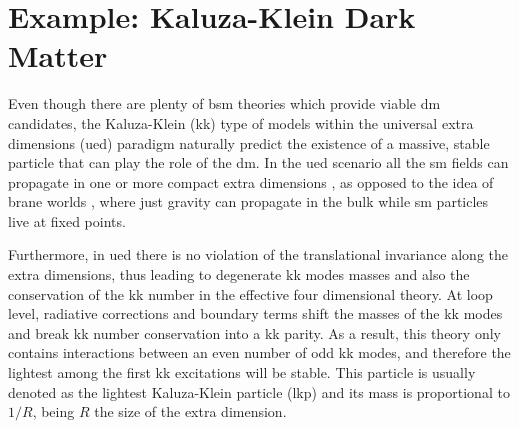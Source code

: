 \section{Example: Kaluza-Klein Dark Matter}
\label{sec:dm_analysis_kk_dm}

Even though there are plenty of \gls{bsm} theories which provide viable \gls{dm} candidates, the Kaluza-Klein (\gls{kk}) type of models \cite{Kaluza1921, Klein1926} within the universal extra dimensions (\gls{ued}) paradigm naturally predict the existence of a massive, stable particle that can play the role of the \gls{dm}. In the \gls{ued} scenario all the \gls{sm} fields can propagate in one or more compact extra dimensions \cite{Appelquist2000}, as opposed to the idea of brane worlds \cite{Arkani-Hamed1998, Randall1999}, where just gravity can propagate in the bulk while \gls{sm} particles live at fixed points.

Furthermore, in \gls{ued} there is no violation of the translational invariance along the extra dimensions, thus leading to degenerate \gls{kk} modes masses  and also the conservation of the \gls{kk} number in the effective four dimensional theory. At loop level, radiative corrections and boundary terms shift the masses of the \gls{kk} modes and break \gls{kk} number conservation into a \gls{kk} parity. As a result, this theory only contains interactions between an even number of odd \gls{kk} modes, and therefore the lightest among the first \gls{kk} excitations will be stable. This particle is usually denoted as the lightest Kaluza-Klein particle (\gls{lkp}) and its mass is proportional to $1/R$, being $R$ the size of the extra dimension.


